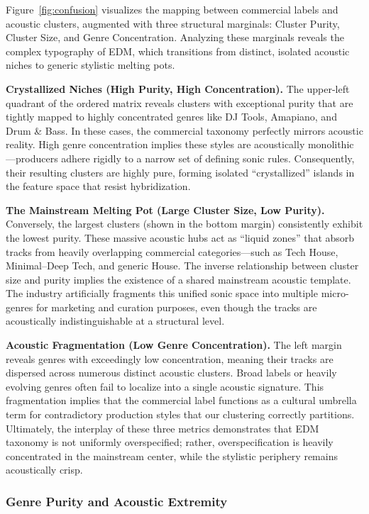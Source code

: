 \documentclass{article}
\begin{document}
	Figure~\ref{fig:confusion} visualizes the mapping between commercial labels and acoustic clusters, augmented with three structural marginals: Cluster Purity, Cluster Size, and Genre Concentration. Analyzing these marginals reveals the complex typography of EDM, which transitions from distinct, isolated acoustic niches to generic stylistic melting pots.

	\textbf{Crystallized Niches (High Purity, High Concentration).} The upper-left quadrant of the ordered matrix reveals clusters with exceptional purity that are tightly mapped to highly concentrated genres like DJ Tools, Amapiano, and Drum \& Bass. In these cases, the commercial taxonomy perfectly mirrors acoustic reality. High genre concentration implies these styles are acoustically monolithic---producers adhere rigidly to a narrow set of defining sonic rules. Consequently, their resulting clusters are highly pure, forming isolated ``crystallized'' islands in the feature space that resist hybridization.

	\textbf{The Mainstream Melting Pot (Large Cluster Size, Low Purity).} Conversely, the largest clusters (shown in the bottom margin) consistently exhibit the lowest purity. These massive acoustic hubs act as ``liquid zones'' that absorb tracks from heavily overlapping commercial categories---such as Tech House, Minimal--Deep Tech, and generic House. The inverse relationship between cluster size and purity implies the existence of a shared mainstream acoustic template. The industry artificially fragments this unified sonic space into multiple micro-genres for marketing and curation purposes, even though the tracks are acoustically indistinguishable at a structural level.

	\textbf{Acoustic Fragmentation (Low Genre Concentration).} The left margin reveals genres with exceedingly low concentration, meaning their tracks are dispersed across numerous distinct acoustic clusters. Broad labels or heavily evolving genres often fail to localize into a single acoustic signature. This fragmentation implies that the commercial label functions as a cultural umbrella term for contradictory production styles that our clustering correctly partitions. Ultimately, the interplay of these three metrics demonstrates that EDM taxonomy is not uniformly overspecified; rather, overspecification is heavily concentrated in the mainstream center, while the stylistic periphery remains acoustically crisp.

	\subsubsection{Genre Purity and Acoustic Extremity}
\end{document}
